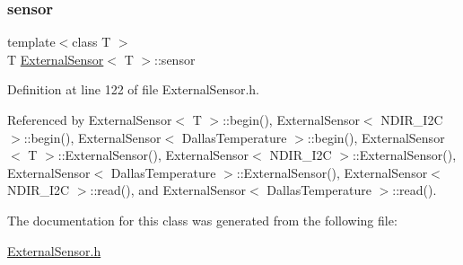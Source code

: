 \subsubsection{\texorpdfstring{sensor}{sensor}}
{\footnotesize\ttfamily template$<$class T $>$ \\
T \hyperlink{classExternalSensor}{External\+Sensor}$<$ T $>$\+::sensor\hspace{0.3cm}{\ttfamily [private]}}



Definition at line 122 of file External\+Sensor.\+h.



Referenced by External\+Sensor$<$ T $>$\+::begin(), External\+Sensor$<$ N\+D\+I\+R\+\_\+\+I2\+C $>$\+::begin(), External\+Sensor$<$ Dallas\+Temperature $>$\+::begin(), External\+Sensor$<$ T $>$\+::\+External\+Sensor(), External\+Sensor$<$ N\+D\+I\+R\+\_\+\+I2\+C $>$\+::\+External\+Sensor(), External\+Sensor$<$ Dallas\+Temperature $>$\+::\+External\+Sensor(), External\+Sensor$<$ N\+D\+I\+R\+\_\+\+I2\+C $>$\+::read(), and External\+Sensor$<$ Dallas\+Temperature $>$\+::read().



The documentation for this class was generated from the following file\+:\begin{DoxyCompactItemize}
\item 
\hyperlink{ExternalSensor_8h}{External\+Sensor.\+h}\end{DoxyCompactItemize}
